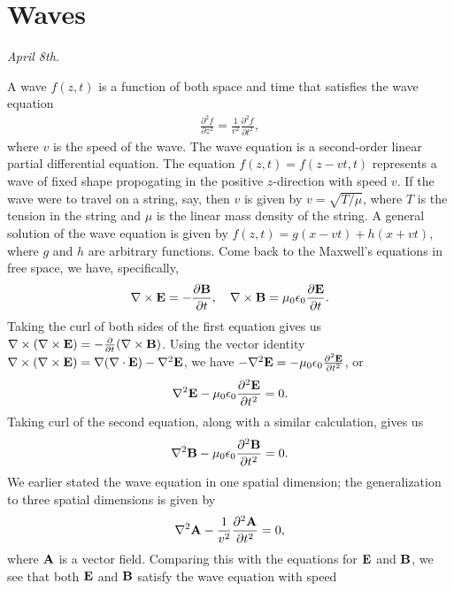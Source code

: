 \section{Waves}
\noindent \textit{April 8th.}

A wave $f(z,t)$ is a function of both space and time that satisfies the wave equation
\begin{align}
    \frac{\partial^{2} f}{\partial z^{2}} = \frac{1}{v^{2}} \frac{\partial^{2} f}{\partial t^{2}},
\end{align}
where $v$ is the speed of the wave. The wave equation is a second-order linear partial differential equation. The equation $f(z,t) = f(z-vt,t)$ represents a wave of fixed shape propogating in the positive $z$-direction with speed $v$. If the wave were to travel on a string, say, then $v$ is given by $v = \sqrt{T/\mu}$, where $T$ is the tension in the string and $\mu$ is the linear mass density of the string. A general solution of the wave equation is given by $f(z,t) = g(x-vt) + h(x+vt)$, where $g$ and $h$ are arbitrary functions. Come back to the Maxwell's equations in free space, we have, specifically,
\begin{align}
    \nabla \times \mathbf{E} = -\frac{\partial{\mathbf{B}}}{\partial{t}}, \quad \nabla \times \mathbf{B} = \mu_{0} \epsilon_{0} \frac{\partial{\mathbf{E}}}{\partial{t}}.
\end{align}
Taking the curl of both sides of the first equation gives us $\nabla \times (\nabla \times \mathbf{E}) = -\frac{\partial}{\partial t} (\nabla \times \mathbf{B})$. Using the vector identity $\nabla \times (\nabla \times \mathbf{E}) = \nabla (\nabla \cdot \mathbf{E}) - \nabla^{2} \mathbf{E}$, we have $-\nabla^{2} \mathbf{E} = -\mu_{0} \epsilon_{0} \frac{\partial^{2} \mathbf{E}}{\partial t^{2}}$, or
\begin{align}
    \nabla^{2} \mathbf{E} -\mu_{0}\epsilon_{0} \frac{\partial^{2} \mathbf{E}}{\partial t^{2}} = 0.
\end{align}
Taking curl of the second equation, along with a similar calculation, gives us
\begin{align}
    \nabla^{2} \mathbf{B} -\mu_{0}\epsilon_{0} \frac{\partial^{2} \mathbf{B}}{\partial t^{2}} = 0.
\end{align}
We earlier stated the wave equation in one spatial dimension; the generalization to three spatial dimensions is given by
\begin{align}
    \nabla^{2} \mathbf{A} - \frac{1}{v^{2}} \frac{\partial^{2} \mathbf{A}}{\partial t^{2}} = 0,
\end{align}
where $\mathbf{A}$ is a vector field. Comparing this with the equations for $\mathbf{E}$ and $\mathbf{B}$, we see that both $\mathbf{E}$ and $\mathbf{B}$ satisfy the wave equation with speed
